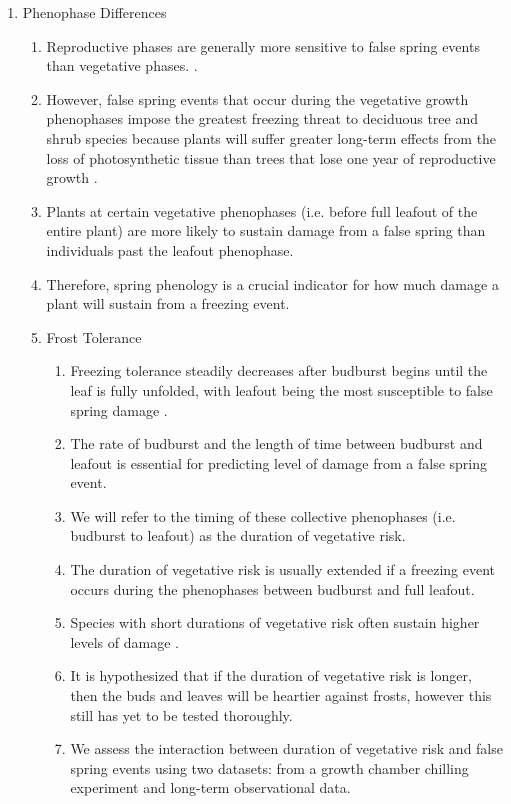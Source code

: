 \documentclass{article}\usepackage[]{graphicx}\usepackage[]{color}
\begin{document}
\begin{enumerate}
\item Phenophase Differences
\begin {enumerate}
\item Reproductive phases are generally more sensitive to false spring events than vegetative phases. \citep{Augspurger2009, Lenz2013}.
\item However, false spring events that occur during the vegetative growth phenophases impose the greatest freezing threat to deciduous tree and shrub species because plants will suffer greater long-term effects from the loss of photosynthetic tissue than trees that lose one year of reproductive growth \citep{Sakai1987}.
\item Plants at certain vegetative phenophases (i.e. before full leafout of the entire plant) are more likely to sustain damage from a false spring than individuals past the leafout phenophase. 
\item Therefore, spring phenology is a crucial indicator for how much damage a plant will sustain from a freezing event.

\item Frost Tolerance
\begin{enumerate}
\item Freezing tolerance steadily decreases after budburst begins until the leaf is fully unfolded, with leafout being the most susceptible to false spring damage \citep {Lenz2016}.
\item The rate of budburst and the length of time between budburst and leafout is essential for predicting level of damage from a false spring event.
\item We will refer to the timing of these collective phenophases (i.e. budburst to leafout) as the duration of vegetative risk.
\item The duration of vegetative risk is usually extended if a freezing event occurs during the phenophases between budburst and full leafout.
\item Species with short durations of vegetative risk often sustain higher levels of damage \citep {Augspurger2009}.
\item It is hypothesized that if the duration of vegetative risk is longer, then the buds and leaves will be heartier against frosts, however this still has yet to be tested thoroughly.
\item We assess the interaction between duration of vegetative risk and false spring events using two datasets: from a growth chamber chilling experiment and long-term observational data.
\end {enumerate}
\end {enumerate}



\end{enumerate}
\end{document}
